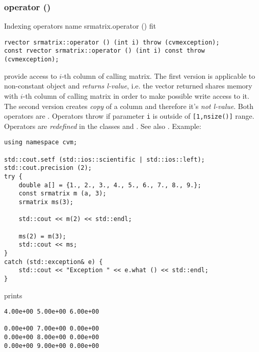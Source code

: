 \subsubsection{operator ()}
Indexing operators%
\pdfdest name {srmatrix.operator ()} fit
\begin{verbatim}
rvector srmatrix::operator () (int i) throw (cvmexception);
const rvector srmatrix::operator () (int i) const throw (cvmexception);
\end{verbatim}
provide access to \hbox{$i$-th} column of calling matrix. The first version
is applicable to  non-constant object and
\emph{returns  l-value}, i.e. the vector returned shares  memory
with \hbox{$i$-th} column of calling matrix
in order to make possible write access to it.
The second version creates  \emph{copy} of a column and therefore it's
\emph{not  l-value}.
Both operators are \Based.
Operators throw 
if parameter \verb"i" is outside of \verb"[1,nsize()]" range.
Operators are \emph{redefined}
in the classes 
and .
See also .
Example:
\begin{Verbatim}
using namespace cvm;

std::cout.setf (std::ios::scientific | std::ios::left); 
std::cout.precision (2);
try {
    double a[] = {1., 2., 3., 4., 5., 6., 7., 8., 9.};
    const srmatrix m (a, 3);
    srmatrix ms(3);

    std::cout << m(2) << std::endl;

    ms(2) = m(3);
    std::cout << ms;
}
catch (std::exception& e) {
    std::cout << "Exception " << e.what () << std::endl;
}
\end{Verbatim}
prints
\begin{Verbatim}
4.00e+00 5.00e+00 6.00e+00

0.00e+00 7.00e+00 0.00e+00
0.00e+00 8.00e+00 0.00e+00
0.00e+00 9.00e+00 0.00e+00
\end{Verbatim}
\newpage



